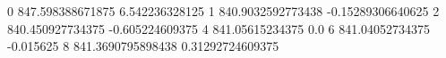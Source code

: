 0 847.598388671875 6.542236328125
1 840.9032592773438 -0.15289306640625
2 840.450927734375 -0.605224609375
4 841.05615234375 0.0
6 841.04052734375 -0.015625
8 841.3690795898438 0.31292724609375
